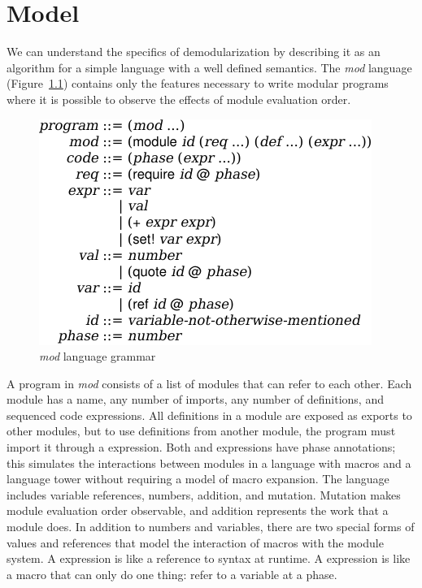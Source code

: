 \chapter{Model}

We can understand the specifics of demodularization by describing it as an algorithm for a simple language with a well defined semantics.
The \emph{mod} language (Figure~\ref{source-lang}) contains only the features necessary to write modular programs where it is possible to observe the effects of module evaluation order.

\begin{figure}[h]
\includegraphics{source}
\caption{\emph{mod} language grammar}
\label{source-lang}
\end{figure}

A program in \emph{mod} consists of a list of modules that can refer to each other.
Each module has a name, any number of imports, any number of definitions, and sequenced code expressions. 
All definitions in a module are exposed as exports to other modules, but to use definitions from another module, the program must import it through a  expression.
Both  and  expressions have phase annotations; this simulates the interactions between modules in a language with macros and a language tower without requiring a model of macro expansion.
The language includes variable references, numbers, addition, and mutation.
Mutation makes module evaluation order observable, and addition represents the work that a module does.
In addition to numbers and variables, there are two special forms of values and references that model the interaction of macros with the module system.
A  expression is like a reference to syntax at runtime.
A  expression is like a macro that can only do one thing: refer to a variable at a phase.


